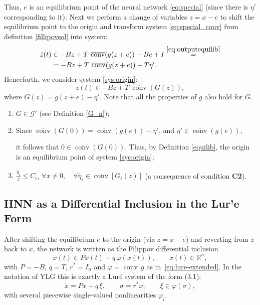 \documentclass[journal]{IEEEtran}
\theoremstyle{myplain}
\begin{document}
Thus, $e$ is an equilibrium point of the neural network \eqref{eq:special} (since there is $\eta'$ corresponding to it). 
Next we perform a change of variables $z=x-e$ to shift the equilibrium point to the origin and transform system \eqref{eq:special_conv} from definition \ref{fillipovsol} into system:
\[
\begin{aligned}
    \dot z(t) &\in - Bz+ T~ \overline{\operatorname{conv}}(g(z+e))+Be+I\overset{\eqref{eq:outputequilib}}{=}\\
    &= -Bz+T~ \overline{\operatorname{conv}}(g(z+e)) - T\eta'.\\
\end{aligned}
\]
Henceforth, we consider system \eqref{sys:origin}:
\begin{equation}\label{sys:origin}
\dot z(t) \in -Bz+T~ \overline{\operatorname{conv}}(G(z)),
\end{equation}
where $G(z)=g(z+e)-\eta'$. Note that all the properties of $g$ also hold for $G$.

\begin{enumerate}
    \item $G\in \mathcal{G'}$ (see Definition \ref{G_n});
    
    \item Since $\overline{\operatorname{conv}}(G(0))=\overline{\operatorname{conv}}(g(e)) -\eta'$, and $\eta' \in \overline{\operatorname{conv}}(g(e))$, 
    
    it follows that $0 \in \overline{\operatorname{conv}}(G(0))$. Thus, by Definition \ref{equilib}, the origin is an equilibrium point of system \eqref{sys:origin};
    \item $ \frac{ \widetilde{\eta_i}}{z} \leqslant C_i $, $\forall x \ne 0, \quad \forall \widetilde{\eta_i} \in  \overline{\operatorname{conv}}[G_i(z)]$ (a consequence of condition \textbf{C2}).
\end{enumerate}


\subsection{HNN as a Differential Inclusion in the Lur'e Form}

After shifting the equilibrium $e$ to the origin (via $z=x-e$) and
reverting from $z$ back to $x$, the network is written as the Filippov
differential inclusion
\begin{equation}\label{eq:HNN-shifted}
      \dot x(t)\in P x(t)+q\,\varphi(x(t)), \qquad x(t)\in\mathbb R^n,
\end{equation}
with $P=-B$, $q=T$, $r^{*}=I_n$ and $\varphi=\overline{\operatorname{conv}}\,g$ as
in~\eqref{eq:lure-extended}.  In the notation of YLG this is exactly a
Lur\'e system of the form (3.1):
\[
  \dot x = P x + q\,\xi,\qquad
  \sigma = r^{*} x,\qquad
  \xi \in \varphi(\sigma),
\]
with several piecewise single-valued nonlinearities $\varphi_i$.
\end{document}
